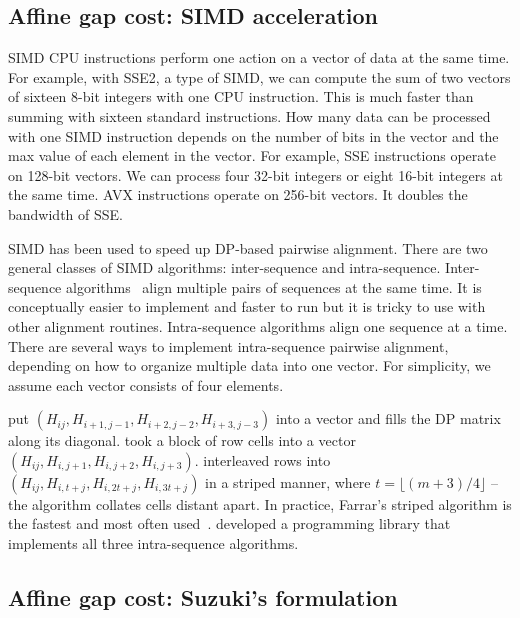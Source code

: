 \documentclass{bioinfo}
\begin{document}
\begin{methods}
\subsection{Affine gap cost: SIMD acceleration}

SIMD CPU instructions perform one action on a vector of data at the same time.
For example, with SSE2, a type of SIMD, we can compute the sum of two vectors
of sixteen 8-bit integers with one CPU instruction. This is much faster than
summing with sixteen standard instructions. How many data can be processed with
one SIMD instruction depends on the number of bits in the vector and the max
value of each element in the vector. For example, SSE instructions operate on
128-bit vectors. We can process four 32-bit integers or eight 16-bit integers
at the same time. AVX instructions operate on 256-bit vectors. It doubles the
bandwidth of SSE.

SIMD has been used to speed up DP-based pairwise alignment. There are two
general classes of SIMD algorithms: inter-sequence and intra-sequence.
Inter-sequence algorithms~\citep{Rognes:2011aa} align multiple pairs of
sequences at the same time. It is conceptually easier to implement and faster
to run but it is tricky to use with other alignment routines. Intra-sequence
algorithms align one sequence at a time. There are several ways to implement
intra-sequence pairwise alignment, depending on how to organize multiple data
into one vector.  For simplicity, we assume each vector consists of four
elements.

\citet{Wozniak:1997aa} put $(H_{ij},H_{i+1,j-1},H_{i+2,j-2},H_{i+3,j-3})$
into a vector and fills the DP matrix along its diagonal.
\citet{Rognes:2000aa} took a block of row cells into a vector
$(H_{ij},H_{i,j+1},H_{i,j+2},H_{i,j+3})$. \citet{Farrar:2007hs} interleaved rows
into $(H_{ij},H_{i,t+j},H_{i,2t+j},H_{i,3t+j})$ in a striped manner, where
$t=\lfloor(m+3)/4\rfloor$ -- the algorithm collates cells distant apart. In
practice, Farrar's striped algorithm is the fastest and most often
used~\citep{Szalkowski:2008aa,Zhao:2013aa}. \citet{Daily:2016aa} developed a
programming library that implements all three intra-sequence algorithms.

\subsection{Affine gap cost: Suzuki's formulation}


\end{methods}
\end{document}
